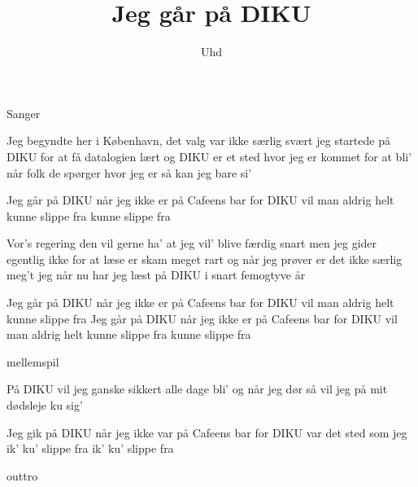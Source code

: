 \documentclass[a4paper,11pt]{article}
\title{Jeg går på DIKU}
\author{Uhd}
\begin{document}
\maketitle

\begin{roles}
 Sanger
\end{roles}

\begin{song}

Jeg begyndte her i København, det valg var ikke særlig svært
jeg startede på DIKU for at få datalogien lært
og DIKU er et sted hvor jeg er kommet for at bli'
når folk de spørger hvor jeg er så kan jeg bare si'

Jeg går på DIKU når jeg ikke er
på Cafeens bar
for DIKU vil man aldrig helt
kunne slippe fra
kunne slippe fra

Vor's regering den vil gerne ha' at jeg vil' blive færdig snart
men jeg gider egentlig ikke for at læse er skam meget rart
og når jeg prøver er det ikke særlig meg't jeg når
nu har jeg læst på DIKU i snart femogtyve år

Jeg går på DIKU når jeg ikke er
på Cafeens bar
for DIKU vil man aldrig helt
kunne slippe fra
Jeg går på DIKU når jeg ikke er
på Cafeens bar
for DIKU vil man aldrig helt
kunne slippe fra
kunne slippe fra

\scene mellemspil

På DIKU vil jeg ganske sikkert alle dage bli'
og når jeg dør så vil jeg på mit dødsleje ku sig'

Jeg gik på DIKU når jeg ikke var
på Cafeens bar
for DIKU var det sted som jeg
ik' ku' slippe fra
ik' ku' slippe fra

\scene outtro

\end{song}
\end{document}
